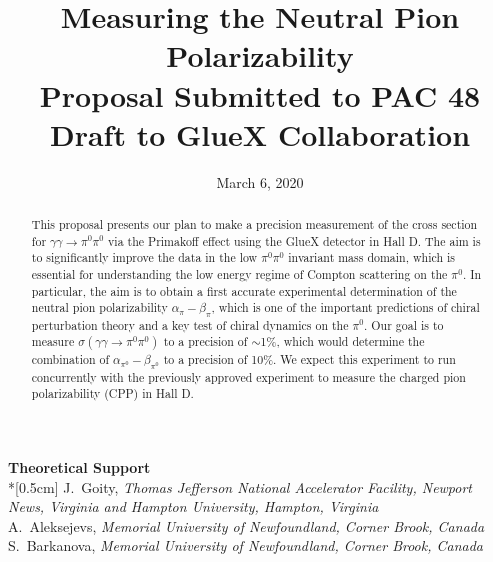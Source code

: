 \documentclass[letterpaper,12pt]{article}
\date{March 6, 2020}
\title{\Large \textbf{Measuring the Neutral Pion Polarizability}\\
\large{Proposal Submitted to PAC 48} \\
\large{ Draft to GlueX Collaboration}
}
\begin{document}
\setlength{\parindent}{0in}


\maketitle

\thispagestyle{empty}

\vspace{3cm}
{\large\textbf {Theoretical Support}} \\*[0.5cm]
\small{J.~Goity, \textit{Thomas Jefferson National Accelerator Facility, Newport News, Virginia and Hampton University, Hampton, Virginia}\\
A.~Aleksejevs,  \textit{Memorial University of Newfoundland, Corner Brook, Canada}\\
S.~Barkanova,  \textit{Memorial University of Newfoundland, Corner Brook, Canada}}



\begin{abstract}
This proposal presents our plan to make a precision measurement of the cross section for $\gamma \gamma \rightarrow \pi^0 \pi^0$ via the Primakoff effect using the GlueX detector in Hall D. The aim is to significantly improve the data in the low $\pi^0\pi^0$ invariant mass domain, which is essential for understanding the low energy regime of Compton scattering on the $\pi^0$. In particular, the aim is to obtain a first accurate experimental determination of the neutral pion polarizability $\alpha_\pi - \beta_\pi$, which is one of the important predictions of chiral perturbation theory and a key test of chiral dynamics on the $\pi^0$.  Our goal is to measure $\sigma(\gamma\gamma\rightarrow\pi^0\pi^0)$ to a precision of $\sim$1\%, which would determine the combination of $\alpha_{\pi^0}-\beta_{\pi^0}$ to a precision of 10\%. We expect this experiment to run concurrently with the previously approved experiment to measure the charged pion polarizability (CPP) \cite{CPPexp} in Hall D.
\end{abstract}
\end{document}

